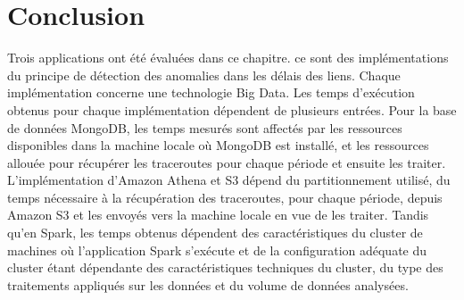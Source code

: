





\section{Conclusion}

Trois applications ont été évaluées dans ce chapitre. ce  sont des  implémentations du principe de détection des anomalies dans les délais des liens. Chaque implémentation  concerne une technologie Big Data. Les temps d'exécution obtenus pour chaque implémentation dépendent de plusieurs entrées. Pour la base de données  MongoDB, les temps  mesurés sont affectés par les ressources disponibles dans la machine locale où MongoDB est installé, et les ressources allouée pour récupérer les traceroutes pour chaque période et ensuite les traiter. L'implémentation d'Amazon Athena et S3 dépend du partitionnement utilisé, du temps nécessaire à la récupération des traceroutes, pour chaque période,  depuis Amazon S3 et les envoyés vers la machine locale en vue de les traiter. Tandis qu'en Spark, les temps obtenus dépendent des caractéristiques du cluster de machines où l'application Spark s'exécute et de la configuration adéquate du cluster étant dépendante des caractéristiques techniques du cluster, du type des traitements appliqués sur les données et du volume de données   analysées.












